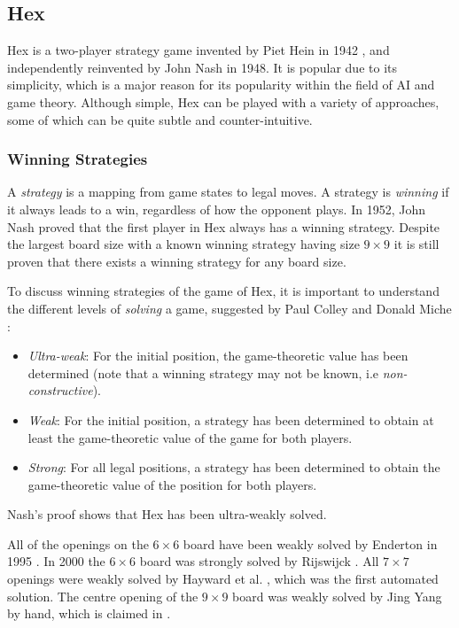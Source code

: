 \subsection{Hex}
Hex is a two-player strategy game invented by Piet Hein in 1942 \cite{pietHein}, and independently reinvented by John Nash in 1948. It is popular due to its simplicity, which is a major reason for its popularity within the field of AI and game theory. Although simple, Hex can be played with a variety of approaches, some of which can be quite subtle and counter-intuitive.





\subsubsection{Winning Strategies}
A \textit{strategy} is a mapping from game states to legal moves. A strategy is \textit{winning} if it always leads to a win, regardless of how the opponent plays.
In 1952, John Nash proved that the first player in Hex always has a winning strategy. Despite the largest board size with a known winning strategy having size $9 \times 9$ \cite{solvingHex} it is still proven that there exists a winning strategy for any board size.

To discuss winning strategies of the game of Hex, it is important to understand the different levels of \textit{solving} a game, suggested by Paul Colley and Donald Miche \cite{allis}:

\begin{itemize}
    \item \textit{Ultra-weak}: For the initial position, the game-theoretic value has been determined (note that a winning strategy may not be known, i.e \textit{non-constructive}).
    \item \textit{Weak}: For the initial position, a strategy has been determined to obtain at least the game-theoretic value of the game for both players.   
    \item \textit{Strong}: For all legal positions, a strategy has been determined to obtain the game-theoretic value of the position for both players.
\end{itemize}

Nash's proof shows that Hex has been ultra-weakly solved.

All of the openings on the $6\times6$ board have been weakly solved by Enderton in 1995 \cite{bert}. In 2000 the $6\times6$ board was strongly solved by Rijswijck \cite{rijswijck}.
All $7\times7$ openings were weakly solved by Hayward et al. \cite{solving7By7}, which was the first automated solution.
The centre opening of the $9\times9$ board was weakly solved by Jing Yang by hand, which is claimed in \cite{solvingHex}.

